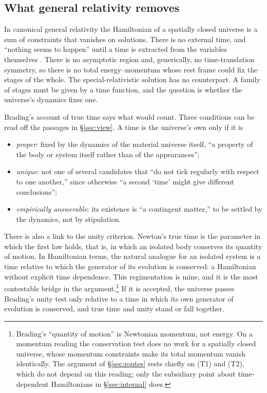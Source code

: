 \documentclass[11pt]{article}
\begin{document}
\subsection{What general relativity removes}

In canonical general relativity the Hamiltonian of a spatially closed universe
is a sum of constraints that vanishes on solutions. There is no external time,
and ``nothing seems to happen'' until a time is extracted from the variables
themselves \citep[sec.~1]{Thiemann2006}. There is no asymptotic region and,
generically, no time-translation symmetry, so there is no total energy--momentum
whose rest frame could fix the stages of the whole. The special-relativistic
solution has no counterpart. A family of stages must be given by a time
function, and the question is whether the universe's dynamics fixes one.

Brading's account of true time says what would count. Three conditions can be
read off the passages in \S\ref{sec:view}. A time is the universe's own only if
it is
\begin{itemize}
\item[(T1)] \emph{proper}: fixed by the dynamics of the material universe
itself, ``a property of the body or system itself rather than of the
appearances'';
\item[(T2)] \emph{unique}: not one of several candidates that ``do not tick
regularly with respect to one another,'' since otherwise ``a second `time'
might give different conclusions'';
\item[(T3)] \emph{empirically answerable}: its existence is ``a contingent
matter,'' to be settled by the dynamics, not by stipulation.
\end{itemize}
There is also a link to the unity criterion. Newton's true time is the parameter
in which the first law holds, that is, in which an isolated body conserves its
quantity of motion. In Hamiltonian terms, the natural analogue for an isolated
system is a time relative to which the generator of its evolution is conserved:
a Hamiltonian without explicit time dependence. This regimentation is mine,
and it is the most contestable bridge in the argument.\footnote{Brading's
``quantity of motion'' is Newtonian momentum, not energy. On a momentum reading
the conservation test does no work for a spatially closed universe, whose
momentum constraints make its total momentum vanish identically. The argument of
\S\ref{sec:routes} rests chiefly on (T1) and (T2), which do not depend on this
reading; only the subsidiary point about time-dependent Hamiltonians in
\S\ref{sec:internal} does.} If it is accepted, the universe passes Brading's
unity test only relative to a time in which its own generator of evolution is
conserved, and true time and unity stand or fall together.
\end{document}
